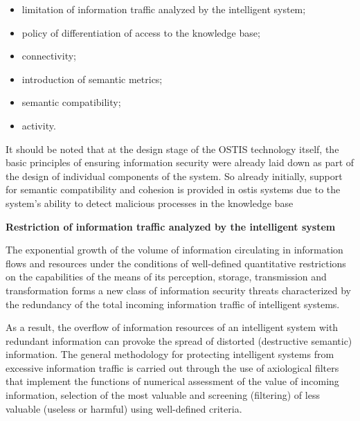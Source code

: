 \documentclass{article}
\begin{document}
\begin{multicols}{2}
\begin{itemize}
   \vspace{0.18cm} \item limitation of information traffic analyzed by the 
intelligent system;
    \item policy of differentiation of access to the knowledge
base;
    \item connectivity;
    \item introduction of semantic metrics;
    \item  semantic compatibility;
    \item activity.
\end{itemize}
\par
It should be noted that at the design stage of the
OSTIS technology itself, the basic principles of ensuring
information security were already laid down as part of
the design of individual components of the system. So
already initially, support for semantic compatibility and
cohesion is provided in ostis systems due to the system’s
ability to detect malicious processes in the knowledge
base
\par
\textbf{Restriction of information traffic analyzed by the
intelligent system
}
\par
The exponential growth of the volume of information
circulating in information flows and resources under the
conditions of well-defined quantitative restrictions on
the capabilities of the means of its perception, storage,
transmission and transformation forms a new class of information security threats characterized by the redundancy
of the total incoming information traffic of intelligent
systems.
\par
As a result, the overflow of information resources of
an intelligent system with redundant information can
provoke the spread of distorted (destructive semantic)
information. The general methodology for protecting
intelligent systems from excessive information traffic is
carried out through the use of axiological filters that
implement the functions of numerical assessment of the
value of incoming information, selection of the most
valuable and screening (filtering) of less valuable (useless
or harmful) using well-defined criteria.


\end{multicols}
\end{document}
